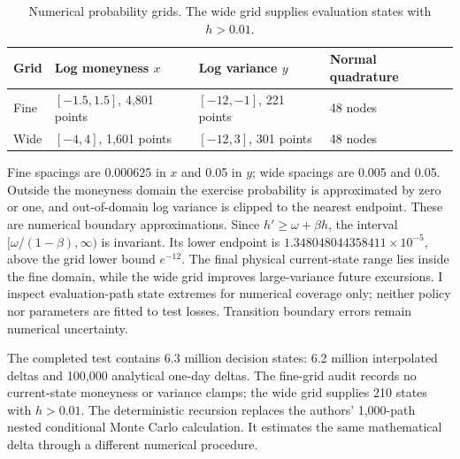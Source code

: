 \documentclass[11pt,a4paper]{article}
\theoremstyle{remark}
\begin{document}
\begin{table}[htbp]
\centering\small
\caption{Numerical probability grids. The wide grid supplies evaluation states with $h>0.01$.}
\label{tab:grids}
\begin{tabular}{@{}llll@{}}
\toprule
Grid & Log moneyness $x$ & Log variance $y$ & Normal quadrature\\
\midrule
Fine & $[-1.5,1.5]$, 4,801 points & $[-12,-1]$, 221 points & 48 nodes\\
Wide & $[-4,4]$, 1,601 points & $[-12,3]$, 301 points & 48 nodes\\
\bottomrule
\end{tabular}
\end{table}
Fine spacings are 0.000625 in $x$ and 0.05 in $y$; wide spacings are 0.005 and 0.05. Outside the moneyness domain the exercise probability is approximated by zero or one, and out-of-domain log variance is clipped to the nearest endpoint. These are numerical boundary approximations. Since $h'\geq\omega+\beta h$, the interval $[\omega/(1-\beta),\infty)$ is invariant. Its lower endpoint is $1.348048044358411\times 10^{-5}$, above the grid lower bound $e^{-12}$. The final physical current-state range lies inside the fine domain, while the wide grid improves large-variance future excursions. I inspect evaluation-path state extremes for numerical coverage only; neither policy nor parameters are fitted to test losses. Transition boundary errors remain numerical uncertainty.

The completed test contains 6.3 million decision states: 6.2 million interpolated deltas and 100,000 analytical one-day deltas. The fine-grid audit records no current-state moneyness or variance clamps; the wide grid supplies 210 states with $h>0.01$. The deterministic recursion replaces the authors' 1,000-path nested conditional Monte Carlo calculation. It estimates the same mathematical delta through a different numerical procedure.
\end{document}
